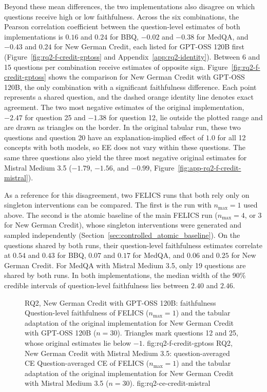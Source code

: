 Beyond these mean differences, the two implementations also disagree on which questions receive high or low faithfulness. Across the six combinations, the Pearson correlation coefficient between the question-level estimates of both implementations is $0.16$ and $0.24$ for BBQ, $-0.02$ and $-0.38$ for MedQA, and $-0.43$ and $0.24$ for New German Credit, each listed for GPT-OSS 120B first (Figure~\ref{fig:rq2-f-credit-gptoss} and Appendix~\ref{app:rq2-identity}). Between 6 and 15 questions per combination receive estimates of opposite sign. Figure~\ref{fig:rq2-f-credit-gptoss} shows the comparison for New German Credit with GPT-OSS 120B, the only combination with a significant faithfulness difference. Each point represents a shared question, and the dashed orange identity line denotes exact agreement. The two most negative estimates of the original implementation, $-2.47$ for question 25 and $-1.38$ for question 12, lie outside the plotted range and are drawn as triangles on the border. In the original tabular run, these two questions and question 20 have an explanation-implied effect of $1.0$ for all 12 concepts with both models, so EE does not vary within these questions. The same three questions also yield the three most negative original estimates for Mistral Medium 3.5 ($-1.79$, $-1.56$, and $-0.99$, Figure~\ref{fig:app-rq2-f-credit-mistral}).

As a reference for this disagreement, two FELICS runs that both rely only on singleton interventions can be compared. The first is the run with $n_{\max}=1$ used above. The second is the atomic baseline of the main FELICS run ($n_{\max}=4$, or $3$ for New German Credit), whose singleton interventions were generated and sampled independently (Section~\ref{sec:controlled_atomic_baseline}). On the questions shared by both runs, their question-level faithfulness estimates correlate at $0.54$ and $0.43$ for BBQ, $0.07$ and $0.17$ for MedQA, and $0.06$ and $0.25$ for New German Credit. For MedQA with Mistral Medium 3.5, only 19 questions are shared by both runs. In both implementations, the median width of the 90\% credible intervals of question-level faithfulness lies between $2.40$ and $2.46$.

\begin{figure}[htb]
  \centering
    {RQ2, New German Credit with GPT-OSS 120B: faithfulness}%
    {Question-level faithfulness of FELICS ($n_{\max}=1$) and the tabular adaptation of the original implementation for New German Credit with GPT-OSS 120B ($n=30$). Triangles mark questions 12 and 25, whose original estimates lie below $-1$.}%
    {fig:rq2-f-credit-gptoss}%
  \hfill
    {RQ2, New German Credit with Mistral Medium 3.5: question-averaged CE}%
    {Question-averaged CE of FELICS ($n_{\max}=1$) and the tabular adaptation of the original implementation for New German Credit with Mistral Medium 3.5 ($n=30$).}%
    {fig:rq2-ce-credit-mistral}%
\end{figure}

